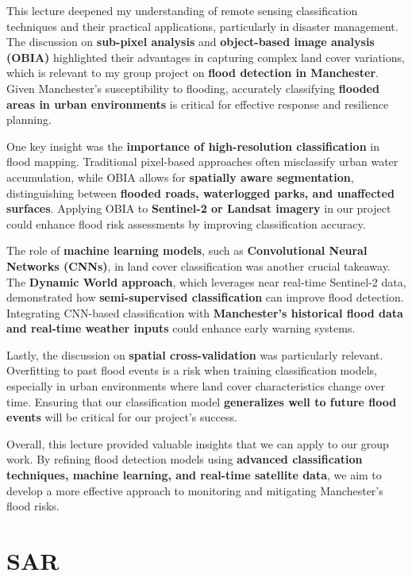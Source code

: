 \documentclass[
  letterpaper,
]{scrbook}
\begin{document}
This lecture deepened my understanding of remote sensing classification
techniques and their practical applications, particularly in disaster
management. The discussion on \textbf{sub-pixel analysis} and
\textbf{object-based image analysis (OBIA)} highlighted their advantages
in capturing complex land cover variations, which is relevant to my
group project on \textbf{flood detection in Manchester}. Given
Manchester's susceptibility to flooding, accurately classifying
\textbf{flooded areas in urban environments} is critical for effective
response and resilience planning.

One key insight was the \textbf{importance of high-resolution
classification} in flood mapping. Traditional pixel-based approaches
often misclassify urban water accumulation, while OBIA allows for
\textbf{spatially aware segmentation}, distinguishing between
\textbf{flooded roads, waterlogged parks, and unaffected surfaces}.
Applying OBIA to \textbf{Sentinel-2 or Landsat imagery} in our project
could enhance flood risk assessments by improving classification
accuracy.

The role of \textbf{machine learning models}, such as
\textbf{Convolutional Neural Networks (CNNs)}, in land cover
classification was another crucial takeaway. The \textbf{Dynamic World
approach}, which leverages near real-time Sentinel-2 data, demonstrated
how \textbf{semi-supervised classification} can improve flood detection.
Integrating CNN-based classification with \textbf{Manchester's
historical flood data and real-time weather inputs} could enhance early
warning systems.

Lastly, the discussion on \textbf{spatial cross-validation} was
particularly relevant. Overfitting to past flood events is a risk when
training classification models, especially in urban environments where
land cover characteristics change over time. Ensuring that our
classification model \textbf{generalizes well to future flood events}
will be critical for our project's success.

Overall, this lecture provided valuable insights that we can apply to
our group work. By refining flood detection models using
\textbf{advanced classification techniques, machine learning, and
real-time satellite data}, we aim to develop a more effective approach
to monitoring and mitigating Manchester's flood risks.


\chapter{SAR}\label{sar}
\end{document}
